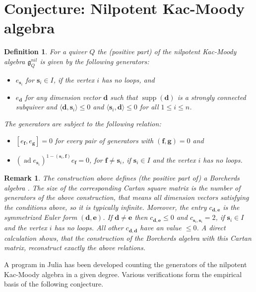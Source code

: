 \documentclass{article}
\newcommand{\bs}{\mathbf{s}}
\newcommand{\bd}{\mathbf{d}}
\newcommand{\be}{\mathbf{e}}
\newcommand{\bbf}{\mathbf{f}}
\newcommand{\bg}{\mathbf{g}}
\DeclareMathOperator{\supp}{supp}
\DeclareMathOperator{\ad}{ad}
\newtheorem{definition}[theorem]{Definition}
\newtheorem{remark}[theorem]{Remark}
\begin{document}
\section{Conjecture: Nilpotent Kac-Moody algebra}


 
 \begin{definition} \label{def nilp Kac-moody}
For a quiver $Q$ the (positive part) of the nilpotent Kac-Moody algebra $\mathfrak{g}^{nil}_Q$ is given by the following generators:
\begin{itemize}
    \item $e_{\bs_i}$ for $\bs_i \in I$, if the vertex $i$ has no loops, and 
     \item $e_\bd$ for any dimension vector $\bd$ such that $\supp(\bd)$ is a strongly connected subquiver and $\langle \bd, \bs_i \rangle \leq 0$ and $\langle \bs_i, \bd \rangle \leq 0$ for all $1 \leq i \leq n$.
\end{itemize}
The generators are subject to the following relation:
\begin{itemize}
    \item $[e_{\bbf}, e_{\bg}] =0$ for every pair of generators with $(\bbf, \bg)=0$ and
   \item $(\ad e_{\bs_i})^{1-(\bs_i, \bbf)} e_{\bbf} = 0$, for $\bbf \neq \bs_i$, if $\bs_i \in I$ and the vertex $i$ has no loops.
\end{itemize}
 \end{definition}

\begin{remark}
The construction above defines (the positive part of) a Borcherds algebra \cite{genkacmoody}. The size of the corresponding Cartan square matrix is the number of generators of the above construction, that means all dimension vectors satisfying the conditions above, so it is typically infinite. Moreover, the entry $c_{\bd, \be}$ is the symmetrized Euler form $(\bd,\be)$. If $\bd \neq \be$ then $c_{\bd, \be} \leq 0$ and $c_{\bs_i, \bs_i}=2$, if $\bs_i \in I$ and the vertex $i$ has no loops. All other $c_{\bd, \bd}$ have an value $\leq 0$. A direct calculation shows, that the construction of the Borcherds algebra with this Cartan matrix, reconstruct exactly the above relations.
\end{remark}

A program in Julia has been developed counting the generators of the nilpotent Kac-Moody algebra in a given degree. Various verifications form the empirical basis of the following conjecture.  
\end{document}
